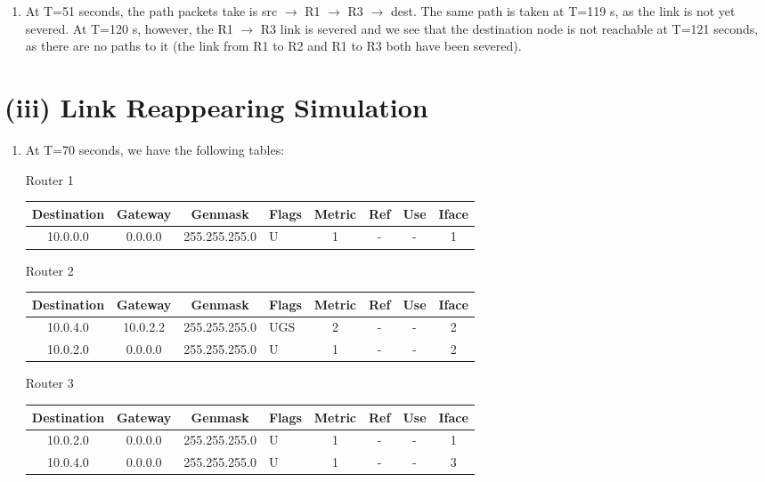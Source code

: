 \documentclass[12pt]{article}
\begin{document}
\begin{enumerate}[label=(\alph*)]
    \item At T=51 seconds, the path packets take is src $\rightarrow$ R1 
        $\rightarrow$ R3 $\rightarrow$ dest. The same path is taken at T=119 s, as 
        the link is not yet severed. At T=120 s, however, the R1 $\rightarrow$ R3 link is severed
        and we see that the destination node is not reachable at T=121 seconds, 
        as there are no paths to it (the link from R1 to R2 and R1 to R3 both 
        have been severed). 

\end{enumerate}

\section*{(iii) Link Reappearing Simulation}
\begin{enumerate}[label=(\alph*)]
    \item At T=70 seconds, we have the following tables:
    \begin{center}
        Router 1

        \begin{tabular}{|c|c|c|l|c|c|c|c|}
            \hline
            Destination & Gateway & Genmask & Flags & Metric & Ref & Use & Iface \\
            \hline
            10.0.0.0 & 0.0.0.0 & 255.255.255.0 & U & 1 & - & - & 1 \\
            \hline
        \end{tabular}

        Router 2

        \begin{tabular}{|c|c|c|l|c|c|c|c|}
            \hline
            Destination & Gateway & Genmask & Flags & Metric & Ref & Use & Iface \\
            \hline
            10.0.4.0 & 10.0.2.2 & 255.255.255.0 & UGS & 2 & - & - & 2 \\
            10.0.2.0 & 0.0.0.0 & 255.255.255.0 & U & 1 & - & - & 2 \\
            \hline
        \end{tabular}

        Router 3

        \begin{tabular}{|c|c|c|l|c|c|c|c|}
            \hline
            Destination & Gateway & Genmask & Flags & Metric & Ref & Use & Iface \\
            \hline
            10.0.2.0 & 0.0.0.0 & 255.255.255.0 & U & 1 & - & - & 1 \\
            10.0.4.0 & 0.0.0.0 & 255.255.255.0 & U & 1 & - & - & 3 \\
            \hline
        \end{tabular}
    \end{center}


\end{enumerate}
\end{document}
